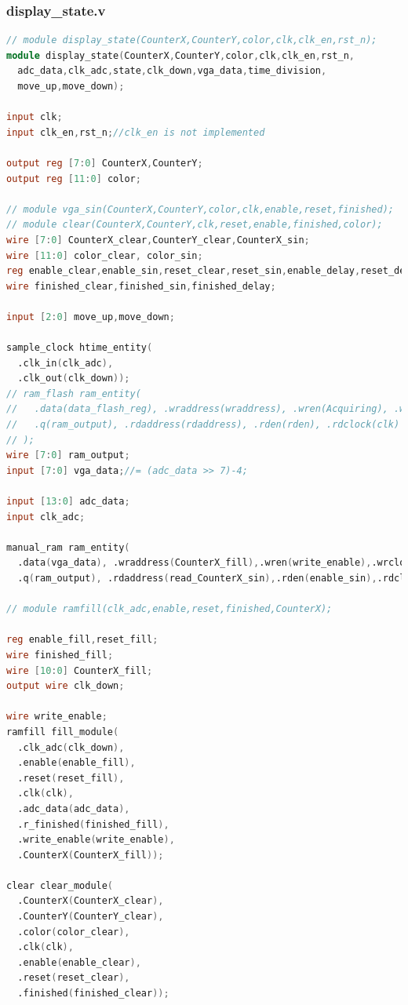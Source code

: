 \documentclass[11pt]{scrartcl}
\begin{document}
\subsubsection{display\_state.v}
\begin{lstlisting}[language=Verilog]
// module display_state(CounterX,CounterY,color,clk,clk_en,rst_n);
module display_state(CounterX,CounterY,color,clk,clk_en,rst_n,
  adc_data,clk_adc,state,clk_down,vga_data,time_division,
  move_up,move_down);

input clk;
input clk_en,rst_n;//clk_en is not implemented

output reg [7:0] CounterX,CounterY;
output reg [11:0] color;

// module vga_sin(CounterX,CounterY,color,clk,enable,reset,finished);
// module clear(CounterX,CounterY,clk,reset,enable,finished,color);
wire [7:0] CounterX_clear,CounterY_clear,CounterX_sin;
wire [11:0] color_clear, color_sin;
reg enable_clear,enable_sin,reset_clear,reset_sin,enable_delay,reset_delay;
wire finished_clear,finished_sin,finished_delay;

input [2:0] move_up,move_down;

sample_clock htime_entity(
  .clk_in(clk_adc),
  .clk_out(clk_down));
// ram_flash ram_entity(
//   .data(data_flash_reg), .wraddress(wraddress), .wren(Acquiring), .wrclock(clk_flash),
//   .q(ram_output), .rdaddress(rdaddress), .rden(rden), .rdclock(clk)
// );
wire [7:0] ram_output;
input [7:0] vga_data;//= (adc_data >> 7)-4;

input [13:0] adc_data;
input clk_adc;

manual_ram ram_entity(
  .data(vga_data), .wraddress(CounterX_fill),.wren(write_enable),.wrclock(clk_down), 
  .q(ram_output), .rdaddress(read_CounterX_sin),.rden(enable_sin),.rdclock(clk));

// module ramfill(clk_adc,enable,reset,finished,CounterX);

reg enable_fill,reset_fill;
wire finished_fill;
wire [10:0] CounterX_fill;
output wire clk_down;

wire write_enable;
ramfill fill_module(
  .clk_adc(clk_down),
  .enable(enable_fill),
  .reset(reset_fill),
  .clk(clk),
  .adc_data(adc_data),
  .r_finished(finished_fill),
  .write_enable(write_enable),
  .CounterX(CounterX_fill));

clear clear_module(
  .CounterX(CounterX_clear),
  .CounterY(CounterY_clear),
  .color(color_clear),
  .clk(clk),
  .enable(enable_clear),
  .reset(reset_clear),
  .finished(finished_clear));


\end{lstlisting}
\end{document}

